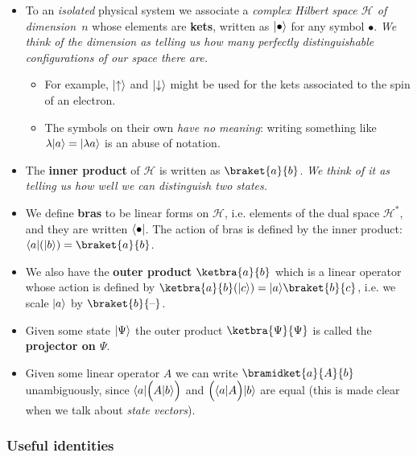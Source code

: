 \documentclass[10pt]{article}
\DeclarePairedDelimiter\bra{\langle}{\rvert}
\DeclarePairedDelimiter\ket{\lvert}{\rangle}
\newcommand{\blank}{\hbox{--}}
\newcommand{\hilb}{\mathcal{H}}
\begin{document}
                \begin{itemize}
                    \item To an \emph{isolated} physical system we associate a \emph{complex Hilbert space $\mathcal{H}$ of \mbox{dimension $n$}} whose elements are \textbf{kets}, written as $\ket{\bullet}$ for any symbol $\bullet$.
                        \emph{We think of the dimension as telling us how many perfectly distinguishable configurations of our space there are.}
                        \begin{itemize}
                            \item For example, $\ket{\uparrow}$ and $\ket{\downarrow}$ might be used for the kets associated to the spin of an electron.
                            \item The symbols on their own \emph{have no meaning}: writing something like $\lambda\ket{a}=\ket{\lambda a}$ is an abuse of notation.
                        \end{itemize}
                    \item The \textbf{inner product} of $\hilb$ is written as $\braket{a}{b}$.
                        \emph{We think of it as telling us how well we can distinguish two states.}
                    \item We define \textbf{bras} to be linear forms on $\hilb$, i.e. elements of the dual space $\hilb^*$, and they are written $\bra{\bullet}$.
                        The action of bras is defined by the inner product: $\bra{a}(\ket{b})=\braket{a}{b}$.
                    \item We also have the \textbf{outer product} $\ketbra{a}{b}$ which is a linear operator whose action is defined by $\ketbra{a}{b}(\ket{c})=\ket{a}\braket{b}{c}$, i.e. we scale $\ket{a}$ by $\braket{b}{\blank}$.
                    \item Given some state $\ket{\Psi}$ the outer product $\ketbra{\Psi}{\Psi}$ is called the \textbf{projector on $\Psi$}.
                    \item Given some linear operator $A$ we can write $\bramidket{a}{A}{b}$ unambiguously, since $\bra{a}\Big(A\ket{b}\Big)$ and $\Big(\bra{a}A\Big)\ket{b}$ are equal (this is made clear when we talk about \emph{state vectors}).
                \end{itemize}

            \subsubsection{Useful identities}
\end{document}
